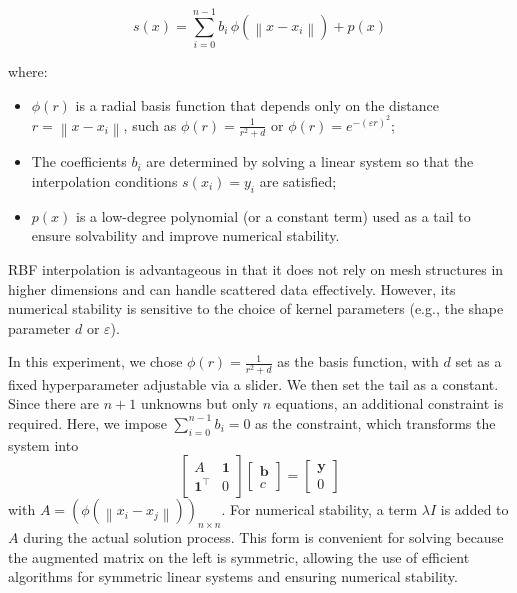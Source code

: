 \documentclass[12pt,a4paper]{report}
\begin{document}
            
            \begin{equation*}
                s\left(x\right) = \sum_{i=0}^{n-1} b_{i} \, \phi\left(\left\lVert x - x_{i}\right\rVert\right) + p\left(x\right)
            \end{equation*}

            where:
            \begin{itemize}
                \item $\phi\left(r\right)$ is a radial basis function that depends only on the distance $r = \left\lVert x-x_i\right\rVert$, such as $\phi\left(r\right) = \frac{1}{r^2 + d}$ or $\phi\left(r\right) = e^{-\left(\varepsilon r\right)^{2}}$;
                \item The coefficients $b_{i}$ are determined by solving a linear system so that the interpolation conditions $s\left(x_{i}\right) = y_{i}$ are satisfied;
                \item $p\left(x\right)$ is a low-degree polynomial (or a constant term) used as a tail to ensure solvability and improve numerical stability.
            \end{itemize}

            RBF interpolation is advantageous in that it does not rely on mesh structures in higher dimensions and can handle scattered data effectively. However, its numerical stability is sensitive to the choice of kernel parameters (e.g., the shape parameter $d$ or $\varepsilon$).

            In this experiment, we chose $\phi\left(r\right) = \frac{1}{r^{2} + d}$ as the basis function, with $d$ set as a fixed hyperparameter adjustable via a slider. We then set the tail as a constant. Since there are $n+1$ unknowns but only $n$ equations, an additional constraint is required. Here, we impose $\sum_{i=0}^{n-1} b_{i} = 0$ as the constraint, which transforms the system into
            \begin{equation*}
                \begin{bmatrix}
                    A & \mathbf{1} \\
                    \mathbf{1}^{\top} & 0
                \end{bmatrix}
                \begin{bmatrix}
                    \mathbf{b} \\
                    c
                \end{bmatrix}
                =
                \begin{bmatrix}
                    \mathbf{y} \\
                    0
                \end{bmatrix}
            \end{equation*}
            with $A = \left(\phi\left(\left\lVert x_{i} - x_{j}\right\rVert\right)\right)_{n\times n}$. For numerical stability, a term $\lambda I$ is added to $A$ during the actual solution process. This form is convenient for solving because the augmented matrix on the left is symmetric, allowing the use of efficient algorithms for symmetric linear systems and ensuring numerical stability.
\end{document}
